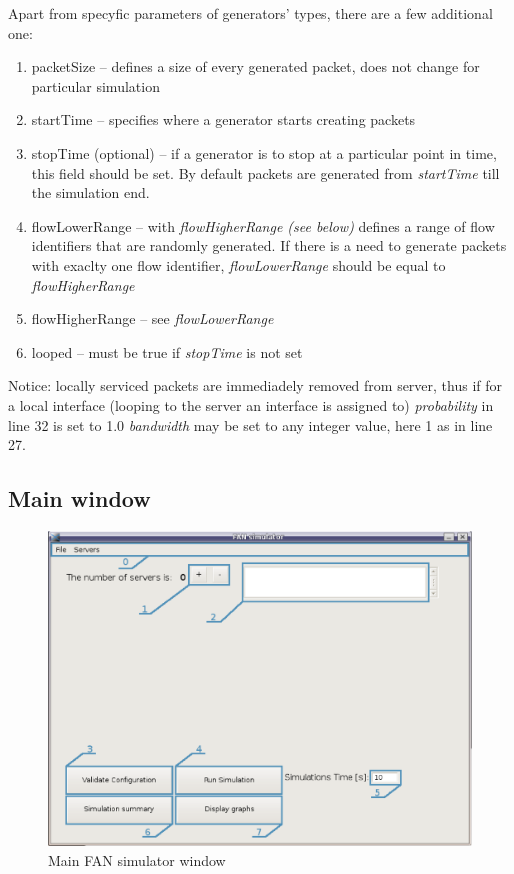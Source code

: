 \documentclass[a4paper,12pt]{article}
\begin{document}
    Apart from specyfic parameters of generators' types, there are a few
    additional one:
    \begin{enumerate}
      \item packetSize -- defines a size of every generated packet, does not
      change for particular simulation
      \item startTime -- specifies where a generator starts creating packets
      \item stopTime (optional) -- if a generator is to stop at a particular
      point in time, this field should be set. By default packets are generated
      from \emph{startTime} till the simulation end.
      \item flowLowerRange -- with \emph{flowHigherRange (see below)} defines a
      range of flow identifiers that are randomly generated. If there is a need
      to generate packets with exaclty one flow identifier,
      \emph{flowLowerRange} should be equal to \emph{flowHigherRange}
      \item flowHigherRange -- see \emph{flowLowerRange}
      \item looped -- must be true if \emph{stopTime} is not set 
    \end{enumerate}
    Notice: locally serviced packets are immediadely removed from server, thus
    if for a local interface (looping to the server an interface is assigned to)
    \emph{probability} in line 32 is set to 1.0 \emph{bandwidth} may be set to
    any integer value, here 1 as in line 27.

	\subsection{Main window}
	
	\begin{figure}[h]
	\includegraphics[width=150mm]{man/MainWindow.eps}
	\caption{Main FAN simulator window}
	\label{MAINWINDOW}
	\end{figure}
\end{document}
